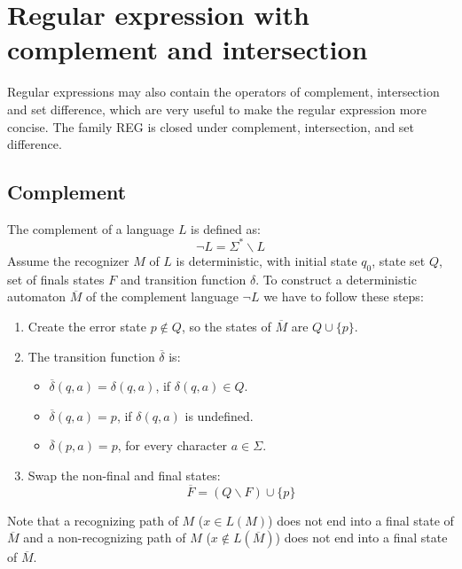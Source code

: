 \section{Regular expression with complement and intersection}

Regular expressions may also contain the operators of complement, intersection and set difference, which are very useful to make the regular expression more concise. 
The family REG is closed under complement, intersection, and set difference. 

\subsection*{Complement}
The complement of a language $L$ is defined as: 
\[\lnot L = \Sigma^{*} \backslash L\]
Assume the recognizer $M$ of $L$ is deterministic, with initial state $q_0$, state set $Q$, set of finals states $F$ and transition function $\delta$. 
To construct a deterministic automaton $\overline{M}$ of the complement language $\lnot L$ we have to follow these steps: 
\begin{enumerate}
    \item Create the error state $p \notin Q$, so the states of $\overline{M}$ are $Q \cup \{ p \}$. 
    \item The transition function $\overline{\delta}$ is: 
        \begin{itemize}
            \item $\overline{\delta}(q,a)=\delta(q,a)$, if $\delta(q,a) \in Q$. 
            \item $\overline{\delta}(q,a)=p$, if $\delta(q,a)$ is undefined. 
            \item $\overline{\delta}(p,a)=p$, for every character $a \in \Sigma$. 
        \end{itemize}
    \item Swap the non-final and final states: 
        \[\overline{F}=(Q \backslash F) \cup \{p\}\]
\end{enumerate}
Note that a recognizing path of $M$ ($x \in L(M)$) does not end into a final state of $\overline{M}$ and a non-recognizing path of $M$ ($x \notin L(\overline{M})$) does not end into a final state of $\overline{M}$.
